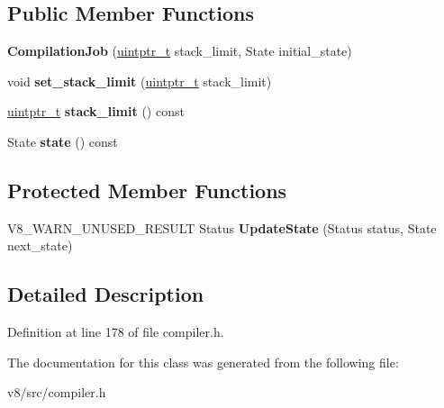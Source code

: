 \subsection*{Public Member Functions}
\begin{DoxyCompactItemize}
\item 
\mbox{\label{classv8_1_1internal_1_1CompilationJob_a46a61d1a138b6002dd0a43db010490d0}} 
{\bfseries Compilation\+Job} (\mbox{\hyperlink{classuintptr__t}{uintptr\+\_\+t}} stack\+\_\+limit, State initial\+\_\+state)
\item 
\mbox{\label{classv8_1_1internal_1_1CompilationJob_a3a1255517c860f474bae022ff12b3102}} 
void {\bfseries set\+\_\+stack\+\_\+limit} (\mbox{\hyperlink{classuintptr__t}{uintptr\+\_\+t}} stack\+\_\+limit)
\item 
\mbox{\label{classv8_1_1internal_1_1CompilationJob_ab77bc6b60d138f6ce2670d2d4092af13}} 
\mbox{\hyperlink{classuintptr__t}{uintptr\+\_\+t}} {\bfseries stack\+\_\+limit} () const
\item 
\mbox{\label{classv8_1_1internal_1_1CompilationJob_a74bf51dfcb1b01a06445bcc1c57a1db9}} 
State {\bfseries state} () const
\end{DoxyCompactItemize}
\subsection*{Protected Member Functions}
\begin{DoxyCompactItemize}
\item 
\mbox{\label{classv8_1_1internal_1_1CompilationJob_a12ee3c64b905b8cd7150a61005f576b4}} 
V8\+\_\+\+W\+A\+R\+N\+\_\+\+U\+N\+U\+S\+E\+D\+\_\+\+R\+E\+S\+U\+LT Status {\bfseries Update\+State} (Status status, State next\+\_\+state)
\end{DoxyCompactItemize}


\subsection{Detailed Description}


Definition at line 178 of file compiler.\+h.



The documentation for this class was generated from the following file\+:\begin{DoxyCompactItemize}
\item 
v8/src/compiler.\+h\end{DoxyCompactItemize}
